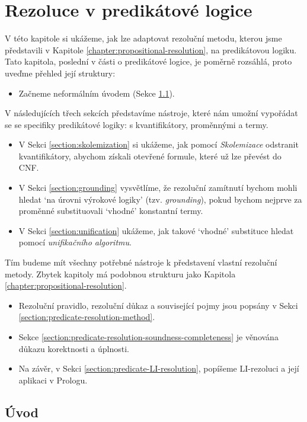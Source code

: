 \chapter{Rezoluce v predikátové logice} 
\label{chapter:predicate-resolution}

V této kapitole si ukážeme, jak lze adaptovat rezoluční metodu, kterou jsme představili v Kapitole \ref{chapter:propositional-resolution}, na predikátovou logiku. Tato kapitola, poslední v části o predikátové logice, je poměrně rozsáhlá, proto uveďme přehled její struktury: 

\begin{itemize}
    \item Začneme neformálním úvodem (Sekce \ref{section:predicate-resolution-intro}).
\end{itemize}
V následujících třech sekcích představíme nástroje, které nám umožní vypořádat se se specifiky predikátové logiky: s kvantifikátory, proměnnými a termy.
\begin{itemize}
    \item V Sekci \ref{section:skolemization} si ukážeme, jak pomocí \emph{Skolemizace} odstranit kvantifikátory, abychom získali otevřené formule, které už lze převést do CNF.
    \item V Sekci \ref{section:grounding} vysvětlíme, že rezoluční zamítnutí bychom mohli hledat `na úrovni výrokové logiky' (tzv. \emph{grounding}), pokud bychom nejprve za proměnné substituovali `vhodné' konstantní termy.
    \item V Sekci \ref{section:unification} ukážeme, jak takové `vhodné' substituce hledat pomocí \emph{unifikačního algoritmu}.
\end{itemize}
Tím budeme mít všechny potřebné nástroje k představení vlastní rezoluční metody. Zbytek kapitoly má podobnou strukturu jako Kapitola \ref{chapter:propositional-resolution}.
\begin{itemize}
    \item Rezoluční pravidlo, rezoluční důkaz a související pojmy jsou popsány v Sekci \ref{section:predicate-resolution-method}.
    \item Sekce \ref{section:predicate-resolution-soundness-completeness} je věnována důkazu korektnosti a úplnosti.
    \item Na závěr, v Sekci \ref{section:predicate-LI-resolution}, popíšeme LI-rezoluci a její aplikaci v Prologu.
\end{itemize}


\section{Úvod}\label{section:predicate-resolution-intro}

